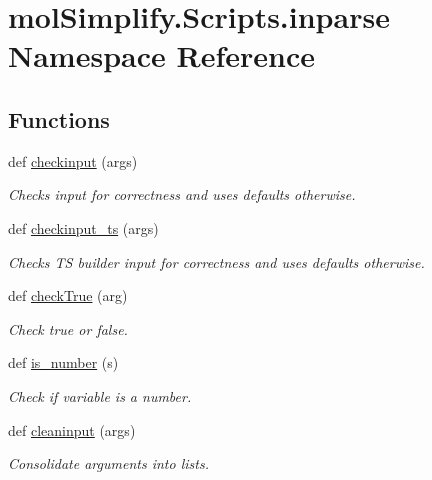 \hypertarget{namespacemolSimplify_1_1Scripts_1_1inparse}{}\section{mol\+Simplify.\+Scripts.\+inparse Namespace Reference}
\label{namespacemolSimplify_1_1Scripts_1_1inparse}
\subsection*{Functions}
\begin{DoxyCompactItemize}
\item 
def \hyperlink{namespacemolSimplify_1_1Scripts_1_1inparse_a203f9e024653c08748547720007d0802}{checkinput} (args)
\begin{DoxyCompactList}\small\item\em Checks input for correctness and uses defaults otherwise. \end{DoxyCompactList}\item 
def \hyperlink{namespacemolSimplify_1_1Scripts_1_1inparse_a31f3057a17648db55232eb494e3cece3}{checkinput\+\_\+ts} (args)
\begin{DoxyCompactList}\small\item\em Checks TS builder input for correctness and uses defaults otherwise. \end{DoxyCompactList}\item 
def \hyperlink{namespacemolSimplify_1_1Scripts_1_1inparse_a93d84b1ced5c90ff2d1e7a8bad01d1d3}{check\+True} (arg)
\begin{DoxyCompactList}\small\item\em Check true or false. \end{DoxyCompactList}\item 
def \hyperlink{namespacemolSimplify_1_1Scripts_1_1inparse_afa3d9a7077dc2f5980b8ee730a08b8ff}{is\+\_\+number} (s)
\begin{DoxyCompactList}\small\item\em Check if variable is a number. \end{DoxyCompactList}\item 
def \hyperlink{namespacemolSimplify_1_1Scripts_1_1inparse_a9929bff732d871d6d76946753dfc078d}{cleaninput} (args)
\begin{DoxyCompactList}\small\item\em Consolidate arguments into lists. \end{DoxyCompactList}\item 

\end{DoxyCompactItemize}
